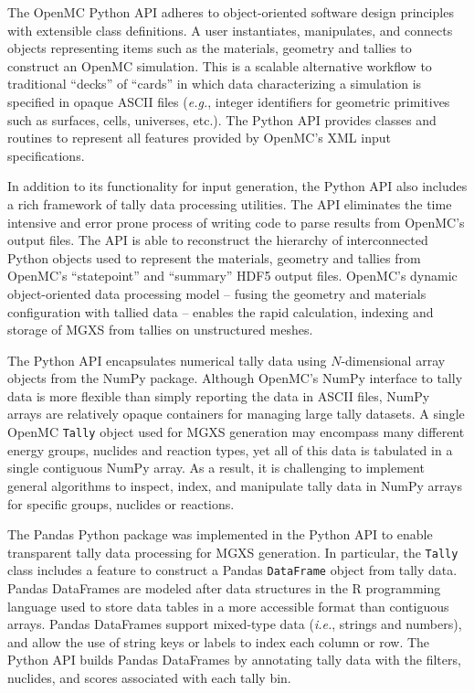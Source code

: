 The OpenMC Python API adheres to object-oriented software design principles with extensible class definitions. A user instantiates, manipulates, and connects objects representing items such as the materials, geometry and tallies to construct an OpenMC simulation. This is a scalable alternative workflow to traditional ``decks'' of ``cards'' in which data characterizing a simulation is specified in opaque ASCII files (\textit{e.g.}, integer identifiers for geometric primitives such as surfaces, cells, universes, etc.). The Python API provides classes and routines to represent all features provided by OpenMC's XML input specifications.

In addition to its functionality for input generation, the Python API also includes a rich framework of tally data processing utilities. The API eliminates the time intensive and error prone process of writing code to parse results from OpenMC's output files. The API is able to reconstruct the hierarchy of interconnected Python objects used to represent the materials, geometry and tallies from OpenMC's ``statepoint'' and ``summary'' HDF5 output files\cite{koranne2011hdf5}. OpenMC's dynamic object-oriented data processing model -- fusing the geometry and materials configuration with tallied data -- enables the rapid calculation, indexing and storage of MGXS from tallies on unstructured meshes.


The Python API encapsulates numerical tally data using $N$-dimensional array objects from the NumPy package\cite{walt2011numpy}. Although OpenMC's NumPy interface to tally data is more flexible than simply reporting the data in ASCII files, NumPy arrays are relatively opaque containers for managing large tally datasets. A single OpenMC \texttt{Tally} object used for MGXS generation may encompass many different energy groups, nuclides and reaction types, yet all of this data is tabulated in a single contiguous NumPy array. As a result, it is challenging to implement general algorithms to inspect, index, and manipulate tally data in NumPy arrays for specific groups, nuclides or reactions.

The Pandas Python package\cite{mckinney2010pandas} was implemented in the Python API to enable transparent tally data processing for MGXS generation. In particular, the \texttt{Tally} class includes a feature to construct a Pandas \texttt{DataFrame} object from tally data. Pandas DataFrames are modeled after data structures in the \textsf{R} programming language used to store data tables in a more accessible format than contiguous arrays. Pandas DataFrames support mixed-type data (\textit{i.e.}, strings and numbers), and allow the use of string keys or labels to index each column or row. The Python API builds Pandas DataFrames by annotating tally data with the filters, nuclides, and scores associated with each tally bin.

